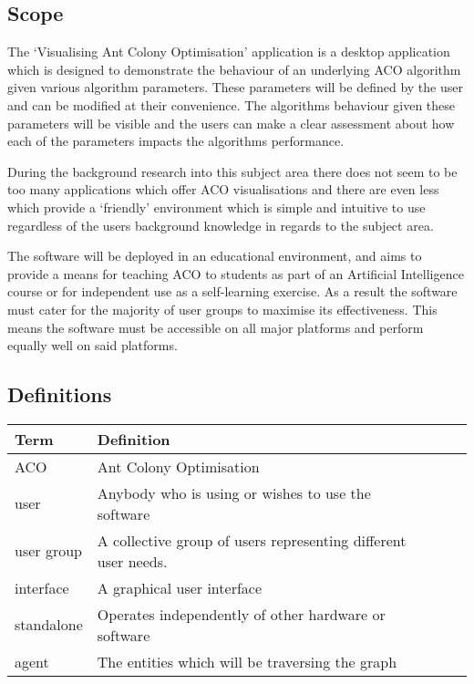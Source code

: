 \documentclass[10pt,a4paper]{article}
\begin{document}
\subsection{Scope}

The `Visualising Ant Colony Optimisation' application is a desktop application which is designed to demonstrate the behaviour of an underlying ACO algorithm given various algorithm parameters. These parameters will be defined by the user and can be modified at their convenience. The algorithms behaviour given these parameters will be visible and the users can make a clear assessment about how each of the parameters impacts the algorithms performance.

During the background research into this subject area there does not seem to be too many applications which offer ACO visualisations and there are even less which provide a `friendly' environment which is simple and intuitive to use regardless of the users background knowledge in regards to the subject area.

The software will be deployed in an educational environment, and aims to provide a means for teaching ACO to students as part of an Artificial Intelligence course or for independent use as a self-learning exercise. As a result the software must cater for the majority of user groups to maximise its effectiveness. This means the software must be accessible on all major platforms and perform equally well on said platforms.

\subsection{Definitions}

\begin{table}[h]
\centering
\begin{tabular}{|l|l|lll}
\textbf{Term} & \textbf{Definition}                                            \\ 
\hline
ACO           & Ant Colony Optimisation                              \\ 
user          & Anybody who is using or wishes to use the software      \\ 
user group    & A collective group of users representing different user needs. \\ 
interface       &A graphical user interface \\
standalone    &Operates independently of other hardware or software\\
agent		&The entities which will be traversing the graph \\
\end{tabular}
\end{table}
\end{document}
